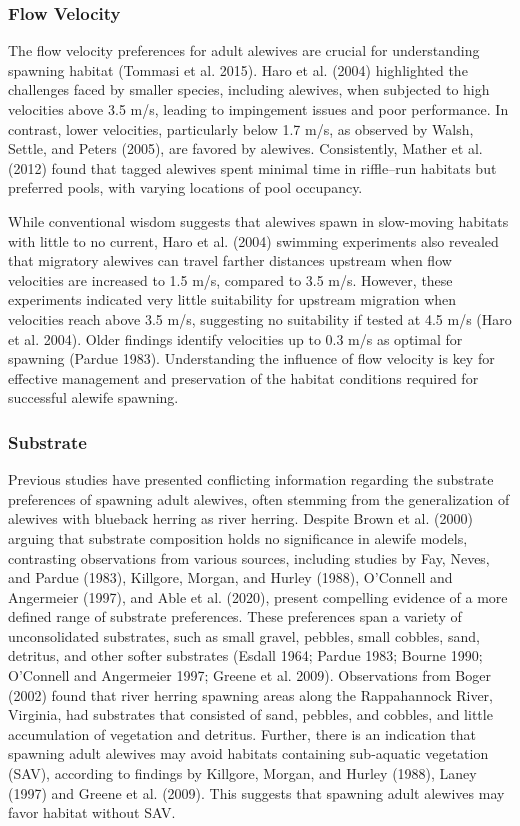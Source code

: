 \documentclass[
]{book}
\begin{document}
\hypertarget{flow-velocity}{%
\subsubsection{Flow Velocity}\label{flow-velocity}}

The flow velocity preferences for adult alewives are crucial for understanding spawning habitat (Tommasi et al. 2015). Haro et al. (2004) highlighted the challenges faced by smaller species, including alewives, when subjected to high velocities above 3.5 m/s, leading to impingement issues and poor performance. In contrast, lower velocities, particularly below 1.7 m/s, as observed by Walsh, Settle, and Peters (2005), are favored by alewives. Consistently, Mather et al. (2012) found that tagged alewives spent minimal time in riffle--run habitats but preferred pools, with varying locations of pool occupancy.

While conventional wisdom suggests that alewives spawn in slow-moving habitats with little to no current, Haro et al. (2004) swimming experiments also revealed that migratory alewives can travel farther distances upstream when flow velocities are increased to 1.5 m/s, compared to 3.5 m/s. However, these experiments indicated very little suitability for upstream migration when velocities reach above 3.5 m/s, suggesting no suitability if tested at 4.5 m/s (Haro et al. 2004). Older findings identify velocities up to 0.3 m/s as optimal for spawning (Pardue 1983). Understanding the influence of flow velocity is key for effective management and preservation of the habitat conditions required for successful alewife spawning.

\hypertarget{substrate}{%
\subsubsection{Substrate}\label{substrate}}

Previous studies have presented conflicting information regarding the substrate preferences of spawning adult alewives, often stemming from the generalization of alewives with blueback herring as river herring. Despite Brown et al. (2000) arguing that substrate composition holds no significance in alewife models, contrasting observations from various sources, including studies by Fay, Neves, and Pardue (1983), Killgore, Morgan, and Hurley (1988), O'Connell and Angermeier (1997), and Able et al. (2020), present compelling evidence of a more defined range of substrate preferences. These preferences span a variety of unconsolidated substrates, such as small gravel, pebbles, small cobbles, sand, detritus, and other softer substrates (Esdall 1964; Pardue 1983; Bourne 1990; O'Connell and Angermeier 1997; Greene et al. 2009). Observations from Boger (2002) found that river herring spawning areas along the Rappahannock River,
Virginia, had substrates that consisted of sand, pebbles, and cobbles, and little accumulation of vegetation and detritus. Further, there is an indication that spawning adult alewives may avoid habitats containing sub-aquatic vegetation (SAV), according to findings by Killgore, Morgan, and Hurley (1988), Laney (1997) and Greene et al. (2009). This suggests that spawning adult alewives may favor habitat without SAV.
\end{document}
